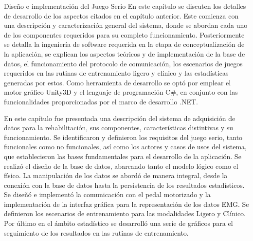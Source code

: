 \begin{thesischapter}{2} {Diseño e implementación del Juego Serio}
En este capítulo se discuten los detalles de desarrollo de los aspectos citados en el capítulo anterior. Este comienza con una descripción y caracterización general del sistema, donde se abordan cada uno de los componentes requeridos para su completo funcionamiento. Posteriormente se detalla la ingeniería de software requerida en la etapa de conceptualización de la aplicación, se explican los aspectos teóricos y de implementación de la base de datos, el funcionamiento del protocolo de comunicación, los escenarios de juegos requeridos en las rutinas de entrenamiento ligero y clínico y las estadísticas generadas por estos. Como herramienta de desarrollo se optó por emplear el motor gráfico Unity3D y el lenguaje de programación C\#, en conjunto con las funcionalidades proporcionadas por el marco de desarrollo .NET.


     
    

















En este capítulo fue presentada una descripción del sistema de adquisición de datos para la rehabilitación, sus componentes, características distintivas y su funcionamiento. Se identificaron y definieron los requisitos del juego  serio, tanto funcionales como no funcionales, así como los actores y casos de usos del sistema, que establecieron las bases fundamentales para el desarrollo de la aplicación. Se realizó el diseño de la base de datos, abarcando tanto el modelo lógico como el físico. La manipulación de los datos se abordó de manera integral, desde la conexión con la base de datos hasta la persistencia de los resultados estadísticos. Se diseñó e implementó la comunicación con el pedal motorizado y la implementación de la interfaz gráfica para la representación de los datos EMG. Se definieron los escenarios de entrenamiento para las modalidades Ligero y Clínico. Por último en el ámbito estadístico se desarrolló una serie de gráficos para el seguimiento de los resultados en las rutinas de entrenamiento.   
\end{thesischapter}